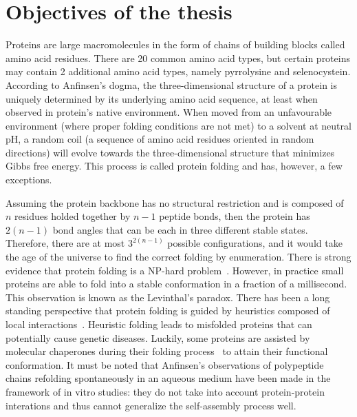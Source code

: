 \section{Objectives of the thesis}

    \setcounter{page}{1}
    \vspace*{0.5cm}

    Proteins are large macromolecules in the form of chains of building blocks called amino acid residues.
    There are 20 common amino acid types, but certain proteins may contain 2 additional amino acid types, namely pyrrolysine and selenocystein.
    According to Anfinsen's dogma, the three-dimensional structure of a protein is uniquely determined by its underlying amino acid sequence,
    at least when observed in protein's native environment. When moved from an unfavourable environment (where proper folding conditions are not met)
    to a solvent at neutral pH, a random coil (a sequence of amino acid residues
    oriented in random directions) will evolve towards the three-dimensional structure that minimizes Gibbs free energy.
    This process is called protein folding and has, however, a few exceptions.

    Assuming the protein backbone has no structural restriction and is composed of $n$ residues holded together by $n-1$ peptide bonds,
    then the protein has $2(n-1)$ bond angles that can be each in three different stable states. Therefore, there are at most
    $3^{2(n-1)}$ possible configurations, and it would take the age of the universe to find the correct folding by enumeration.
    There is strong evidence that protein folding is a NP-hard problem~\cite{hart1997robust}.
    However, in practice small proteins are able to fold into a stable conformation in a fraction of a millisecond.
    This observation is known as the Levinthal's paradox. There has been a long standing perspective that protein folding
    is guided by heuristics composed of local interactions~\cite{levinthal1969fold}. Heuristic folding leads to misfolded proteins
    that can potentially cause genetic diseases.
    Luckily, some proteins are assisted by molecular chaperones during their folding process~\cite{ellis1991molecular}
    to attain their functional conformation. It must be noted that Anfinsen's observations of polypeptide chains refolding
    spontaneously in an aqueous medium have been made in the framework of in vitro studies:
    they do not take into account protein-protein interations and thus cannot generalize the self-assembly process well.

